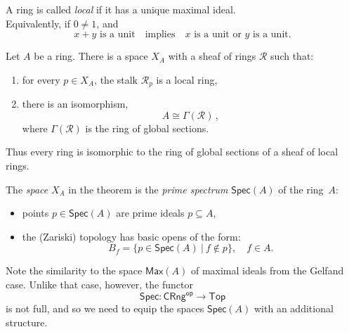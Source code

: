 \documentclass[graybox]{svmult}
\newcommand{\myemph}[1]{\emph{#1}}
\begin{document}

\begin{definition} A  ring is called \emph{local} if it has a unique maximal ideal. \\
Equivalently, if $0\neq 1$, and
\begin{equation}\label{eq:localring}
\text{$x+y$ is a unit}\quad\text{implies}\quad\text{$x$ is a unit or $y$ is a unit}.
\end{equation}
\end{definition}
%
\begin{theorem}
Let $A$ be a ring.  There is a space $X_A$ with a sheaf of rings $\mathcal{R}$ such that:
\begin{enumerate}
\item for every $p\in X_A$, the stalk $\mathcal{R}_p$ is a local ring, 
\item there is an isomorphism, $$A\cong \Gamma(\mathcal{R})\,,$$
where $\Gamma(\mathcal{R})$ is the ring of global sections.
\end{enumerate}
Thus every ring is isomorphic to the ring of global sections of a sheaf of local rings.
\end{theorem}


The \myemph{space} $X_A$ in the theorem is the \emph{prime spectrum} $\mathsf{Spec}(A)$ of the ring~$A$:
 \begin{itemize}
\item points $p\in \mathsf{Spec}(A)$ are prime ideals $p\subseteq A$,
\item the (Zariski) topology has basic opens of the form:
 $$B_f = \{ p\in \mathsf{Spec}(A)\ |\ f\not\in p \}, \quad f\in A.$$
\end{itemize}
Note the similarity to the space $\mathsf{Max}(A)$ of maximal ideals from the Gelfand case.  
Unlike that case, however, the functor 
\[
\mathsf{Spec} : \mathsf{CRng}^\mathsf{op} \to \mathsf{Top}
 \]
is not full, and so we need to equip the spaces  $\mathsf{Spec}(A)$ with an additional structure.
\end{document}
